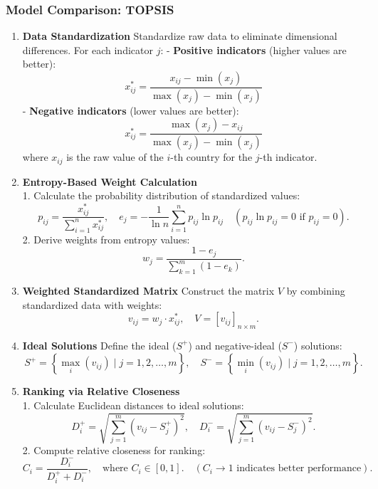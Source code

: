     \subsubsection{Model Comparison: TOPSIS} %
        \begin{enumerate}
            \item \textbf{Data Standardization}
                Standardize raw data to eliminate dimensional differences.
                For each indicator \(j\):
                - \textbf{Positive indicators} (higher values are better):
                \[
                    x_{ij}^* = \frac{x_{ij} - \min(x_j)}{\max(x_j) - \min(x_j)}
                \]
                - \textbf{Negative indicators} (lower values are better):
                \[
                    x_{ij}^* = \frac{\max(x_j) - x_{ij}}{\max(x_j) - \min(x_j)}
                \]
                where \(x_{ij}\) is the raw value of the \(i\)-th country for the \(j\)-th indicator.
            \item \textbf{Entropy-Based Weight Calculation} \\
                1. Calculate the probability distribution of standardized values:
                \[
                    p_{ij} = \frac{x_{ij}^*}{\sum_{i=1}^n x_{ij}^*}, \quad e_j = -\frac{1}{\ln n} \sum_{i=1}^n p_{ij} \ln p_{ij} \quad (p_{ij} \ln p_{ij} = 0 \text{ if } p_{ij}=0).
                \]
                2. Derive weights from entropy values:
                \[
                    w_j = \frac{1 - e_j}{\sum_{k=1}^m (1 - e_k)}.
                \]
            \item \textbf{Weighted Standardized Matrix}
                Construct the matrix \(V\) by combining standardized data with weights:
                \[
                    v_{ij} = w_j \cdot x_{ij}^*, \quad V = [v_{ij}]_{n \times m}.
                \]
            \item \textbf{Ideal Solutions}
                Define the ideal (\(S^+\)) and negative-ideal (\(S^-\)) solutions:
                \[
                    S^+ = \left\{ \max_{i}(v_{ij}) \mid j=1,2,\dots,m \right\}, \quad S^- = \left\{ \min_{i}(v_{ij}) \mid j=1,2,\dots,m \right\}.
                \]
            \item \textbf{Ranking via Relative Closeness} \\
                1. Calculate Euclidean distances to ideal solutions:
                \[
                    D_i^+ = \sqrt{\sum_{j=1}^m (v_{ij} - S_j^+)^2}, \quad D_i^- = \sqrt{\sum_{j=1}^m (v_{ij} - S_j^-)^2}.
                \]
                2. Compute relative closeness for ranking:
                \[
                    C_i = \frac{D_i^-}{D_i^+ + D_i^-}, \quad \text{where } C_i \in [0,1]. \quad (C_i \to 1 \text{ indicates better performance}).
                \]
        \end{enumerate}

